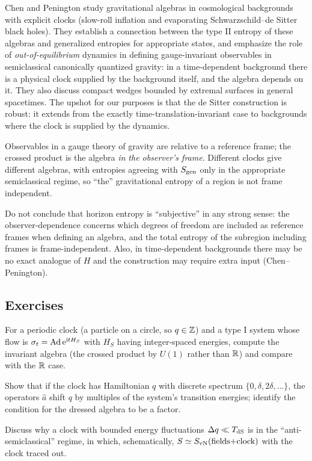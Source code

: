 Chen and Penington \cite{ChenPenington2024} study gravitational algebras in cosmological backgrounds with explicit clocks (slow-roll inflation and evaporating Schwarzschild--de Sitter black holes). They establish a connection between the type II entropy of these algebras and generalized entropies for appropriate states, and emphasize the role of \emph{out-of-equilibrium} dynamics in defining gauge-invariant observables in semiclassical canonically quantized gravity: in a time-dependent background there is a physical clock supplied by the background itself, and the algebra depends on it. They also discuss compact wedges bounded by extremal surfaces in general spacetimes. The upshot for our purposes is that the de Sitter construction is robust: it extends from the exactly time-translation-invariant case to backgrounds where the clock is supplied by the dynamics.

\begin{keyidea}
Observables in a gauge theory of gravity are relative to a reference frame; the crossed product is the algebra \emph{in the observer's frame}. Different clocks give different algebras, with entropies agreeing with $S_{\mathrm{gen}}$ only in the appropriate semiclassical regime, so ``the'' gravitational entropy of a region is not frame independent.
\end{keyidea}

\begin{whatwrong}
Do not conclude that horizon entropy is ``subjective'' in any strong sense: the observer-dependence concerns which degrees of freedom are included as reference frames when defining an algebra, and the total entropy of the subregion including frames is frame-independent. Also, in time-dependent backgrounds there may be no exact analogue of $H$ and the construction may require extra input (Chen--Penington).
\end{whatwrong}

\subsection*{Exercises}
\begin{exercise}\label{ex:clocks_qrf:1}
For a periodic clock (a particle on a circle, so $q\in\mathbb{Z}$) and a type I system whose flow is $\sigma_t=\operatorname{Ad}\mathrm{e}^{\mathrm{i} t H_S}$ with $H_S$ having integer-spaced energies, compute the invariant algebra (the crossed product by $U(1)$ rather than $\mathbb{R}$) and compare with the $\mathbb{R}$ case.
\end{exercise}
\begin{exercise}\label{ex:clocks_qrf:2}
Show that if the clock has Hamiltonian $q$ with discrete spectrum $\{0,\delta,2\delta,\dots\}$, the operators $\hat a$ shift $q$ by multiples of the system's transition energies; identify the condition for the dressed algebra to be a factor.
\end{exercise}
\begin{exercise}\label{ex:clocks_qrf:3}
Discuss why a clock with bounded energy fluctuations $\Delta q\ll T_{\rm dS}$ is in the ``anti-semiclassical'' regime, in which, schematically, $S\simeq S_{\rm vN}(\text{fields+clock})$ with the clock traced out.
\end{exercise}

